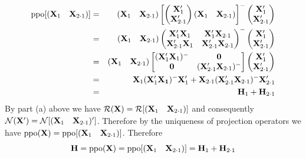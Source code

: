 \begin{eqnarray*}
\mathop{\rm ppo}[(\begin{matrix}{\bf X}_1&{\bf X}_{2\cdot1}
\end{matrix})]
&=&(\begin{matrix}{\bf X}_1&{\bf X}_{2\cdot1}\end{matrix})
\left[
\left(\begin{matrix}
{\bf X}_1'\cr
{\bf X}_{2\cdot1}'
\end{matrix}\right)
(\begin{matrix}{\bf X}_1&{\bf X}_{2\cdot1}\end{matrix})
\right]^{-{}}
\left(\begin{matrix}
{\bf X}_1'\cr
{\bf X}_{2\cdot1}'
\end{matrix}\right)\\
&=&
(\begin{matrix}{\bf X}_1&{\bf X}_{2\cdot1}\end{matrix})
%
\left(
\begin{matrix}
{\bf X}_1'{\bf X}_1 & {\bf X}_1'{\bf X}_{2\cdot1}\cr
{\bf X}_{2\cdot1}'{\bf X}_1 & {\bf X}_{2\cdot1}'{\bf X}_{2\cdot1}
\end{matrix}\right)^{-{}}
%
\left(\begin{matrix}
{\bf X}_1'\cr
{\bf X}_{2\cdot1}'
\end{matrix}\right)\\
&=&
(\begin{matrix}{\bf X}_1&{\bf X}_{2\cdot1}\end{matrix})
\left[
\begin{matrix}
({\bf X}_1'{\bf X}_1)^{-{}} & {\bf 0}\cr
{\bf 0} & ({\bf X}_{2\cdot1}'{\bf X}_{2\cdot1})^{-{}}
\end{matrix}\right]
%
\left(\begin{matrix}
{\bf X}_1'\cr
{\bf X}_{2\cdot1}'
\end{matrix}\right)\\
&=&{\bf X}_1({\bf X}_1'{\bf X_1})^{-{}}{\bf X}_1'
+{\bf X}_{2\cdot1}({\bf X}_{2\cdot1}'{\bf X}_{2\cdot1})^{-{}}
{\bf X}_{2\cdot1}'\\
&=&{\bf H}_1+{\bf H}_{2\cdot1}
\end{eqnarray*}
By part (a) above we have
${\cal R}({\bf X})={\cal R}[(\begin{matrix}{\bf X}_1&{\bf X}_{2\cdot1}
\end{matrix})]$
and consequently
${\cal N}({\bf X}')={\cal N}[(\begin{matrix}{\bf X}_1&{\bf X}_{2\cdot1}
\end{matrix})']$.
Therefore by the uniqueness of projection operators we have
$\mathop{\rm ppo}({\bf X})
=\mathop{\rm ppo}[(\begin{matrix}{\bf X}_1&{\bf X}_{2\cdot1}
\end{matrix})]$.
Therefore
$${\bf H}=
\mathop{\rm ppo}({\bf X})
=\mathop{\rm ppo}[(\begin{matrix}{\bf X}_1&{\bf X}_{2\cdot1}
\end{matrix})]
={\bf H}_1+{\bf H}_{2\cdot1}$$

